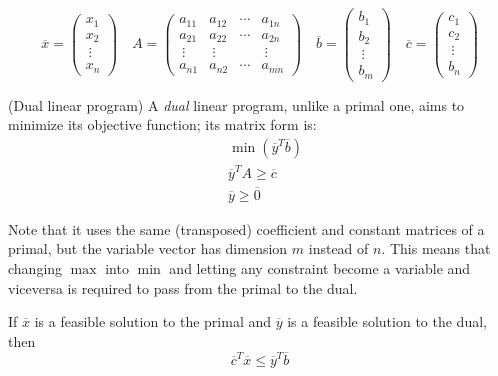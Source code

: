 \[
    \overline{x} =
    \begin{pmatrix}
        x_1 \\ x_2 \\ \ \vdots \\ x_n
    \end{pmatrix}
    \quad
    A =
    \begin{pmatrix}
        a_{11} & a_{12} & \cdots & a_{1n} \\
        a_{21} & a_{22} & \cdots & a_{2n} \\
        \ \vdots & \ \vdots &  & \ \vdots \\
        a_{n1} & a_{n2} & \cdots & a_{mn}
    \end{pmatrix}
    \quad
    \overline{b} =
    \begin{pmatrix}
        b_1 \\ b_2 \\ \ \vdots \\ b_m
    \end{pmatrix}
    \quad
    \overline{c} =
    \begin{pmatrix}
        c_1 \\ c_2 \\ \ \vdots \\ b_n
    \end{pmatrix}
\]

\begin{definition}(Dual linear program)\label{def:lpdual}
    A \emph{dual} linear program, unlike a primal one, aims to minimize its objective function; its matrix form is:
    \begin{equation}\label{dual-matrix}
        \begin{aligned}
            &\min(\overline{y}^T \overline{b}) \\
            &\overline{y}^T A \geq \overline{c} \\
            &\overline{y} \geq \overline{0}
        \end{aligned}
    \end{equation}
    
    Note that it uses the same (transposed) coefficient and constant matrices of a primal, but the variable vector has dimension $m$ instead of $n$. This means that changing $\max$ into $\min$ and letting any constraint become a variable and viceversa is required to pass from the primal to the dual.
\end{definition}

\begin{theorem}\label{thm:weak-duality}
    If $\overline{x}$ is a feasible solution to the primal and $\overline{y}$ is a feasible solution to the dual, then
    \begin{equation}
        \overline{c}^T \overline{x} \leq \overline{y}^T \overline{b}
    \end{equation}
\end{theorem}

